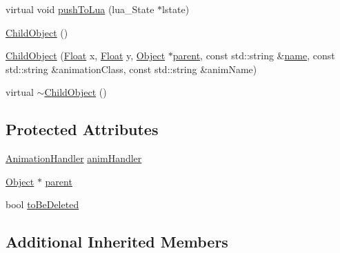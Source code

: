 \begin{DoxyCompactItemize}
\item 
virtual void \hyperlink{classZeta_1_1ChildObject_ad424271e178d77b184385a7254a6e712}{push\+To\+Lua} (lua\+\_\+\+State $\ast$lstate)
\item 
\hyperlink{classZeta_1_1ChildObject_a7a76839e0b4a8438ed74f2cea71a1e39}{Child\+Object} ()
\item 
\hyperlink{classZeta_1_1ChildObject_a60bb3b34fb53d06c8d8272d0046ade4d}{Child\+Object} (\hyperlink{namespaceZeta_a1e0a1265f9b3bd3075fb0fabd39088ba}{Float} x, \hyperlink{namespaceZeta_a1e0a1265f9b3bd3075fb0fabd39088ba}{Float} y, \hyperlink{classZeta_1_1Object}{Object} $\ast$\hyperlink{classZeta_1_1ChildObject_aca8fcd19fdb0291c58a21cd91046e4aa}{parent}, const std\+::string \&\hyperlink{classZeta_1_1Object_ace4ef81b7c300e0a170292e9888cd66f}{name}, const std\+::string \&animation\+Class, const std\+::string \&anim\+Name)
\item 
virtual \hyperlink{classZeta_1_1ChildObject_a33d32a8ccc1b63bbe462568c63abeeef}{$\sim$\+Child\+Object} ()
\end{DoxyCompactItemize}
\subsection*{Protected Attributes}
\begin{DoxyCompactItemize}
\item 
\hyperlink{classZeta_1_1AnimationHandler}{Animation\+Handler} \hyperlink{classZeta_1_1ChildObject_aa53737b5485a63b87c9e50c5f0b9652b}{anim\+Handler}
\item 
\hyperlink{classZeta_1_1Object}{Object} $\ast$ \hyperlink{classZeta_1_1ChildObject_aca8fcd19fdb0291c58a21cd91046e4aa}{parent}
\item 
bool \hyperlink{classZeta_1_1ChildObject_aefd99848653386c7e7d98d2f9d66f25d}{to\+Be\+Deleted}
\end{DoxyCompactItemize}
\subsection*{Additional Inherited Members}


